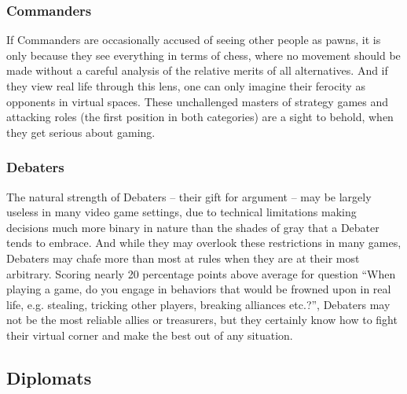 \documentclass{article}
\begin{document}
\subsubsection{Commanders}
If Commanders are occasionally accused of seeing other people as pawns, it is only because they see everything in terms of chess, where no movement should be made without a careful analysis of the relative merits of all alternatives. And if they view real life through this lens, one can only imagine their ferocity as opponents in virtual spaces. These unchallenged masters of strategy games and attacking roles (the first position in both categories) are a sight to behold, when they get serious about gaming.
\subsubsection{Debaters}
The natural strength of Debaters – their gift for argument – may be largely useless in many video game settings, due to technical limitations making decisions much more binary in nature than the shades of gray that a Debater tends to embrace. And while they may overlook these restrictions in many games, Debaters may chafe more than most at rules when they are at their most arbitrary. Scoring nearly 20 percentage points above average for question “When playing a game, do you engage in behaviors that would be frowned upon in real life, e.g. stealing, tricking other players, breaking alliances etc.?”, Debaters may not be the most reliable allies or treasurers, but they certainly know how to fight their virtual corner and make the best out of any situation.
\subsection{Diplomats}
\end{document}
